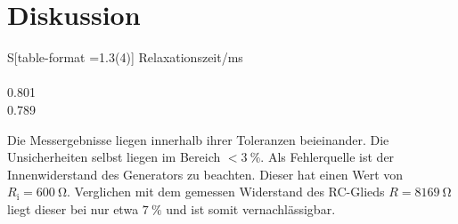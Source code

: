\section{Diskussion}
\label{sec:Diskussion}
\begin{table}
  \centering
  \begin{tabular}{S[table-format =1.3(4)]}
    \toprule
    {Relaxationszeit/\si{\milli\second}}\\
     \\
    0.801 \\
    0.789\\
    \bottomrule
  \end{tabular}
\end{table}
\noindent
Die Messergebnisse liegen innerhalb ihrer Toleranzen beieinander. Die Unsicherheiten selbst liegen im Bereich $<\SI{3}{\percent}$.
Als Fehlerquelle ist der Innenwiderstand des Generators zu beachten. Dieser hat einen Wert von $R_\text{i} = \SI{600}{\ohm}$. Verglichen mit dem gemessen Widerstand des RC-Glieds $R=\SI{8169}{\ohm}$ liegt dieser bei nur etwa $\SI{7}{\percent}$ und ist somit vernachlässigbar.
